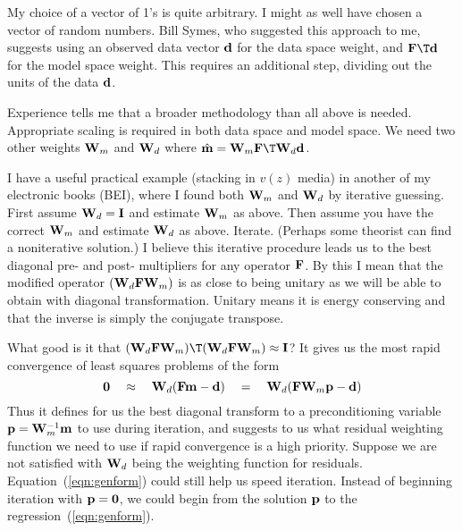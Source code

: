 \par
My choice of a vector of 1's is quite arbitrary.
I might as well have chosen a vector of random numbers.
Bill Symes, who suggested this approach to me,
suggests using an observed data vector $\bold d$ for the data space weight,
and $\bold F\T \bold d$ for the model space weight.
This requires an additional step, dividing out the units of the data $\bold d$.

\par
Experience tells me that a broader methodology than all above is needed.
Appropriate scaling is required in both data space and model space.
We need two other weights
$\bold W_m$ and
$\bold W_d$ where
$\hat{\bold m} = \bold W_m \bold F\T\bold W_d \bold d$.


\par
I have a useful practical example (stacking in $v(z)$ media)
in another of my electronic books (BEI),
where I found both
$\bold W_m$ and
$\bold W_d$ by iterative guessing.
First assume $\bold W_d =\bold I$ and estimate $\bold W_m$ as above.
Then assume you have the correct $\bold W_m$ and estimate $\bold W_d$ as above.
Iterate.
(Perhaps some theorist can find a noniterative solution.)
I believe this iterative procedure leads us to the best diagonal
pre- and post- multipliers for any operator $\bold F$.  
By this I mean that the modified operator 
$(\bold W_d \bold F \bold W_m)$
is as close to being unitary as we will be able to obtain
with diagonal transformation.
Unitary means it is energy conserving and that the inverse
is simply the conjugate transpose.
\par
What good is it that
$(\bold W_d \bold F \bold W_m)\T
(\bold W_d \bold F \bold W_m) \approx \bold I$?
It gives us the most rapid convergence of least squares problems of the form
\begin{equation}
\label{eqn:genform}
\bold 0 \quad\approx\quad \bold W_d ( \bold F\bold m - \bold d)
\quad =\quad               \bold W_d ( \bold F\bold W_m \bold p - \bold d)
\end{equation}
Thus it defines for us the best
diagonal transform to a
preconditioning variable
$\bold p=\bold W_m^{-1}\bold m$ to use during iteration,
and suggests to us what residual weighting function we need to use if
rapid convergence is a high priority.
Suppose we are not satisfied with $\bold W_d$ being the weighting function
for residuals.  Equation~(\ref{eqn:genform}) could still help us speed iteration.
Instead of beginning iteration with $\bold p=\bold 0$,
we could begin from the solution $\bold p$
to the regression~(\ref{eqn:genform}).

